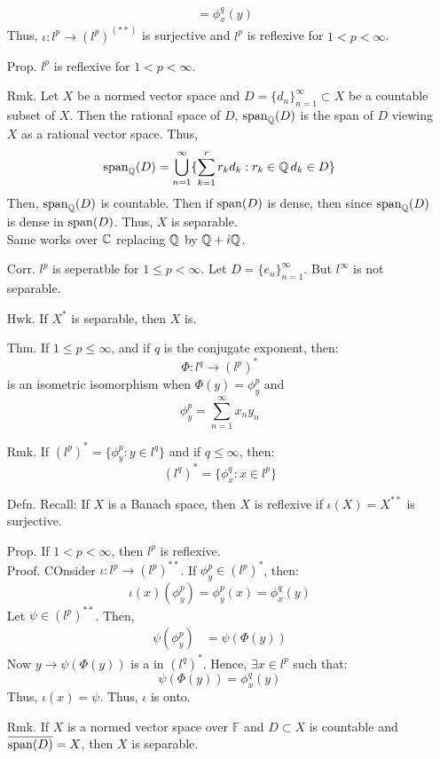 \documentclass[12pt]{article}
\begin{document}
\begin{itemize}
\begin{align*}
        &= \phi_x^q(y)
    \end{align*}  
    Thus, $\iota: l^p \to (l^p)^(**)$ is surjective and $l^p$ is reflexive for $1 < p < \infty$.
    \item[Prop.] $l^p$ is reflexive for $1 < p < \infty$.
    \item[Rmk.] Let $X$ be a normed vector space and $D = \{d_n\}_{n=1}^\infty \subset X$ be a countable subset of $X$. Then the rational space of $D$, $\operatorname{span}_\mathbb Q(D)$ is the span of $D$ viewing $X$ as a rational vector space. Thus,
    \[\operatorname{span}_\mathbb Q(D) = \bigcup_{n=1}^\infty \{\sum_{k=1}^r r_kd_k : r_k\in\mathbb Q \, d_k \in D\}\]
    Then, $\operatorname{span}_\mathbb Q(D)$ is countable. Then if $\operatorname{span}(D)$ is dense, then since $\operatorname{span}_\mathbb Q(D)$ is dense in $\operatorname{span}(D)$. Thus, $X$ is separable. \\
    Same works over $\mathbb C$ replacing $\mathbb Q$ by $\mathbb Q + i\mathbb Q$. 
    \item[Corr.] $l^p$ is seperatble for $1 \leq p < \infty$. Let $D = \{e_n\}_{n=1}^\infty$. But $l^\infty$ is not separable. 
    \item[Hwk.] If $X^*$ is separable, then $X$ is.  
    \newpage 
    \item[Thm.] If $1 \leq p \leq \infty$, and if $q$ is the conjugate exponent, then: 
    \[ \Phi: l^q \to (l^p)^* \]
    is an isometric isomorphism when $\Phi(y) = \phi_y^p$ and 
    \[ \phi_y^p = \sum_{n=1}^{\infty} x_ny_n\]
    \item[Rmk.] If $(l^p)^* = \{\phi_y^p : y \in l^q\}$ and if $q \leq \infty$, then: 
    \[ (l^q)^* = \{\phi_x^q : x \in l^p\}\] 
    \item[Defn.] Recall: If $X$ is a Banach space, then $X$ is reflexive if $\iota(X) = X^{**}$ is surjective.
    \item[Prop.] If $1 < p < \infty$, then $l^p$ is reflexive.\\ 
    Proof. COnsider $\iota: l^p \to (l^p)^{**}$. If $\phi_y^p \in (l^p)^*$, then: 
    \[ \iota(x)(\phi_y^p) = \phi_y^p(x) = \phi_x^q(y) \]
    Let $\psi \in (l^p)^{**}$. Then,
    \begin{align*}
        \psi(\phi_y^p) &= \psi(\Phi(y))
    \end{align*}
    Now $y \to \psi(\Phi(y))$ is a in $(l^q)^*$. Hence, $\exists x \in l^p$ such that:
    \[ \psi(\Phi(y)) = \phi_x^q(y) \]
    Thus, $\iota(x) = \psi$. Thus, $\iota$ is onto.
    \item[Rmk.] If $X$ is a normed vector space over $\mathbb{F}$ and $D \subset X$ is countable and $\overline{\operatorname{span}(D)} = X$, then $X$ is separable. 

\end{itemize}
\end{document}
